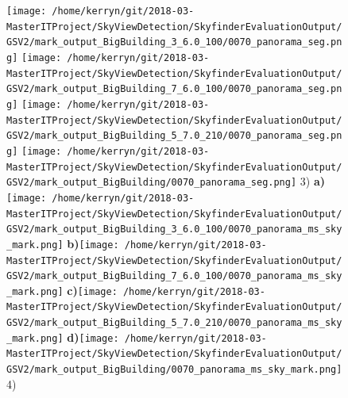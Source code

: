 \documentclass{article}
\begin{document}
\begin{figure}
\textbf{}\texttt{[image: /home/kerryn/git/2018-03-MasterITProject/SkyViewDetection/SkyfinderEvaluationOutput/GSV2/mark\_output\_BigBuilding\_3\_6.0\_100/0070\_panorama\_seg.png]} 
\textbf{}\texttt{[image: /home/kerryn/git/2018-03-MasterITProject/SkyViewDetection/SkyfinderEvaluationOutput/GSV2/mark\_output\_BigBuilding\_7\_6.0\_100/0070\_panorama\_seg.png]} 
\textbf{}\texttt{[image: /home/kerryn/git/2018-03-MasterITProject/SkyViewDetection/SkyfinderEvaluationOutput/GSV2/mark\_output\_BigBuilding\_5\_7.0\_210/0070\_panorama\_seg.png]} 
\textbf{}\texttt{[image: /home/kerryn/git/2018-03-MasterITProject/SkyViewDetection/SkyfinderEvaluationOutput/GSV2/mark\_output\_BigBuilding/0070\_panorama\_seg.png]} \scriptsize{3)}
\textbf{\scriptsize{a)}}\texttt{[image: /home/kerryn/git/2018-03-MasterITProject/SkyViewDetection/SkyfinderEvaluationOutput/GSV2/mark\_output\_BigBuilding\_3\_6.0\_100/0070\_panorama\_ms\_sky\_mark.png]} 
\textbf{\scriptsize{b)}}\texttt{[image: /home/kerryn/git/2018-03-MasterITProject/SkyViewDetection/SkyfinderEvaluationOutput/GSV2/mark\_output\_BigBuilding\_7\_6.0\_100/0070\_panorama\_ms\_sky\_mark.png]} 
\textbf{\scriptsize{c)}}\texttt{[image: /home/kerryn/git/2018-03-MasterITProject/SkyViewDetection/SkyfinderEvaluationOutput/GSV2/mark\_output\_BigBuilding\_5\_7.0\_210/0070\_panorama\_ms\_sky\_mark.png]} 
\textbf{\scriptsize{d)}}\texttt{[image: /home/kerryn/git/2018-03-MasterITProject/SkyViewDetection/SkyfinderEvaluationOutput/GSV2/mark\_output\_BigBuilding/0070\_panorama\_ms\_sky\_mark.png]} \scriptsize{4)}


\end{figure} 
\end{document}
